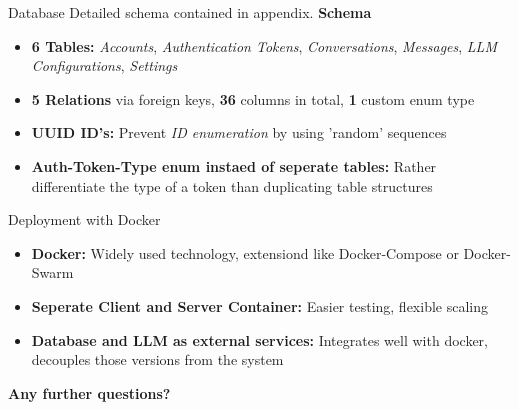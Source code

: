\documentclass{sdqbeamer}[en]
\begin{document}
\begin{frame}{Database}
Detailed schema contained in appendix.
    \vspace{2em}
\break
    \textbf{Schema}
    \begin{itemize}
        \item \textbf{6 Tables: } \textit{Accounts}, \textit{Authentication Tokens}, \textit{Conversations}, \textit{Messages}, \textit{LLM Configurations}, \textit{Settings}
        \item \textbf{5 Relations} via foreign keys, \textbf{36} columns in total, \textbf{1} custom enum type
    \end{itemize}
    \vspace{0.5em}
    \begin{itemize}
        \item<2-> \textbf{UUID ID's: } Prevent \textit{ID enumeration} by using 'random' sequences
        \item<2-> \textbf{Auth-Token-Type enum instaed of seperate tables: } Rather differentiate the type of a token than duplicating table structures
    \end{itemize} 
\end{frame}

\begin{frame}{Deployment with Docker}
    \begin{itemize}
        \item \textbf{Docker: } Widely used technology, extensiond like Docker-Compose or Docker-Swarm 
        \item \textbf{Seperate Client and Server Container: } Easier testing, flexible scaling
        \item \textbf{Database and LLM as external services: } Integrates well with docker, decouples those versions from the system 
    \end{itemize}
\end{frame}

\begin{frame}{}
\vspace{4em}
\begin{center}
     \Large\textbf{\textcolor{kit-blue60}{Any further questions?}}
\end{center}
\end{frame}
\end{document}
